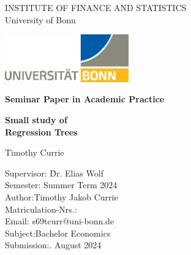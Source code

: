 \thispagestyle{empty}

\begin{center}

    \vspace*{-8mm}

    {\LARGE INSTITUTE OF FINANCE AND STATISTICS\\[1mm]}
    \large University of Bonn\\

    \vspace*{1cm}

    \includegraphics[width=0.4\textwidth]{./Graphics/UNI_Bonn_Logo_Standard_RZ.eps}

    \vspace*{1cm}

    {\Large \textbf{Seminar Paper in Academic Practice}}\\

    \vspace{1cm}

    {\Large \textbf{Small study of}}\\
    \vspace*{1mm}
    {\Large \textbf{Regression Trees}}\\

    \vspace{1.5cm}

    {\LARGE Timothy Currie}\\[15mm]

    \parbox{120mm} {
        \begin{large}
            \begin{tabbing}
                Supervisor: \hspace{1.8cm} \= Dr. Elias Wolf\\[1.5mm]
                Semester:\> Summer Term 2024\\[1.5mm]
                Author:\>Timothy Jakob Currie\\[1.5mm] %
                Matriculation-Nrs.:\\[1.5mm]
                Email:\> s69tcurr@uni-bonn.de\\[1.5mm]
                Subject:\>Bachelor Economics\\[1.5mm]
                Submission:. August 2024\\[1.5mm]
            \end{tabbing}
        \end{large}
    }

\end{center}
\clearpage{\pagestyle{empty}\cleardoublepage}

